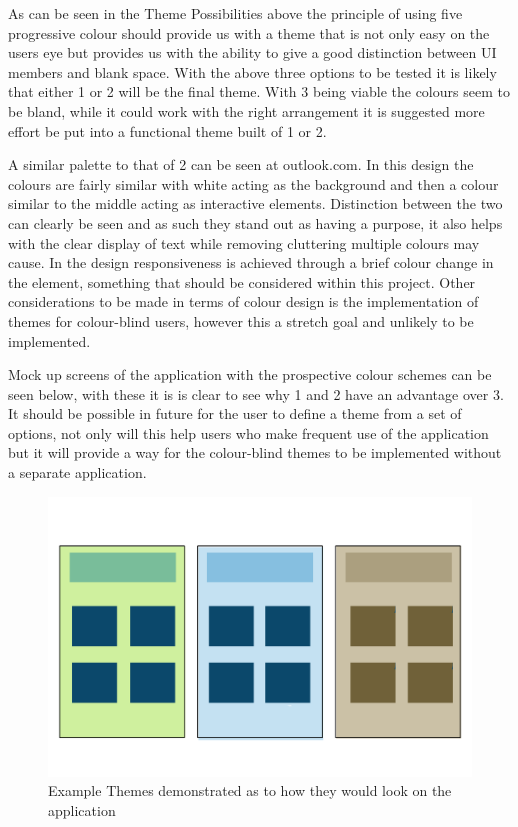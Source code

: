 \newpage
As can be seen in the Theme Possibilities above  the principle of using five progressive colour should provide us with a theme that is not only easy on the users eye but provides us with the ability to give a good distinction between UI members and blank space. With the above three options to be tested it is likely that either 1 or 2 will be the final theme. With 3 being viable the colours seem to be bland, while it could work with the right arrangement it is suggested more effort be put into a functional theme built of 1 or 2. 

A similar palette to that of 2 can be seen at outlook.com. In this design the colours are fairly similar with white acting as the background and then a colour similar to the middle acting as interactive elements. Distinction between the two can clearly be seen and as such they stand out as having a purpose, it also helps with the clear display of text while removing cluttering multiple colours may cause. In the design responsiveness is achieved through a brief colour change in the element, something that should be considered within this project. Other considerations to be made in terms of colour design is the implementation of themes for colour-blind users, however this a stretch goal and unlikely to be implemented. 

Mock up screens of the application with the prospective colour schemes can be seen below, with these it is is clear to see why 1 and 2 have an advantage over 3. It should be possible in future for the user to define a theme from a set of options, not only will this help users who make frequent use of the application but it will provide a way for the colour-blind themes to be implemented without a separate application. \\
\begin{figure}
\includegraphics[scale=0.7]{Chapter2/themes.png} 
\caption[Example Themes]{Example Themes demonstrated as to how they would look on the application}
\end{figure}

